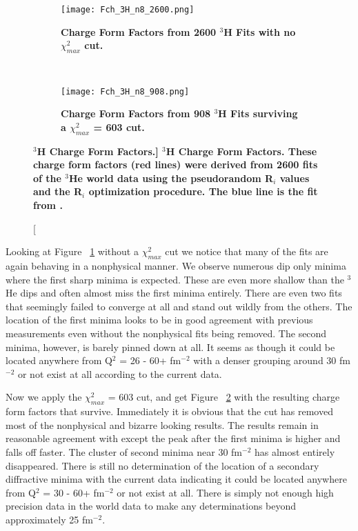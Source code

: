 \begin{figure}[!ht]
\begin{subfigure}{1.\textwidth}
  \centering
  \texttt{[image: Fch\_3H\_n8\_2600.png]}
  \caption{\bf{Charge Form Factors from 2600 $^3$H Fits with no $\chi^2_{max}$ cut.}}
  \label{fig:3h_fch_no_cut}
\end{subfigure}\\
\begin{subfigure}{1.\textwidth}
  \centering
  \texttt{[image: Fch\_3H\_n8\_908.png]}
  \caption{\bf{Charge Form Factors from 908 $^3$H Fits surviving a $\chi^2_{max}$ = 603 cut.}}
  \label{fig:3h_fch_cut}
\end{subfigure}
\caption[\bf{$^3$H Charge Form Factors.}] {
{\bf{$^3$H Charge Form Factors.}} These charge form factors (red lines) were derived from 2600 fits of the $^3$He world data using the pseudorandom R$_i$ values and the R$_i$ optimization procedure. The blue line is the fit from \cite{Article:Amroun}.}
\label{fig:3h_fch}
\end{figure}

Looking at Figure ~\ref{fig:3h_fch_no_cut} without a $\chi^2_{max}$ cut we notice that many of the fits are again behaving in a nonphysical manner. We observe numerous dip only minima where the first sharp minima is expected. These are even more shallow than the $^3$He dips and often almost miss the first minima entirely. There are even two fits that seemingly failed to converge at all and stand out wildly from the others. The location of the first minima looks to be in good agreement with previous measurements even without the nonphysical fits being removed. The second minima, however, is barely pinned down at all. It seems as though it could be located anywhere from Q$^2$ = 26 - 60+ fm$^{-2}$ with a denser grouping around 30 fm$^{-2}$ or not exist at all according to the current data. 

Now we apply the $\chi^2_{max}$ = 603 cut, and get Figure ~\ref{fig:3h_fch_cut} with the resulting charge form factors that survive. Immediately it is obvious that the cut has removed most of the nonphysical and bizarre looking results. The results remain in reasonable agreement with \cite{Article:Amroun} except the peak after the first minima is higher and falls off faster. The cluster of second minima near 30 fm$^{-2}$ has almost entirely disappeared. There is still no determination of the location of a secondary diffractive minima with the current data indicating it could be located anywhere from  Q$^2$ = 30 - 60+ fm$^{-2}$ or not exist at all. There is simply not enough high precision data in the world data to make any determinations beyond approximately 25 fm$^{-2}$.

